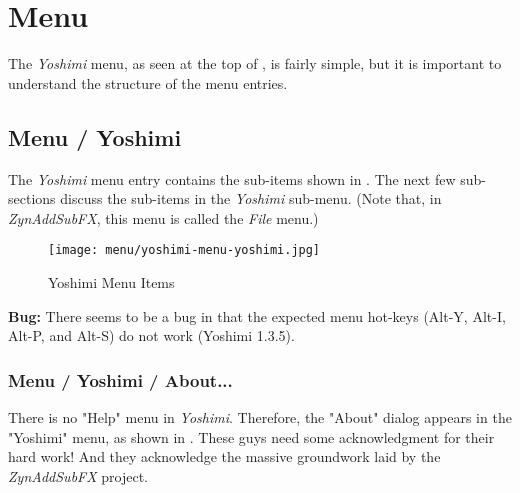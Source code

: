 %
%
%

\section{Menu}
\label{sec:menu}

   The \textsl{Yoshimi} menu, as seen at the top of
   ,
   is fairly simple, but it is important to understand the
   structure of the menu entries.

\subsection{Menu / Yoshimi}
\label{subsec:menu_yoshimi}

   The \textsl{Yoshimi}
   menu entry contains the sub-items shown in
   .
   The next few sub-sections discuss the sub-items in the 
   \textsl{Yoshimi} sub-menu.
   (Note that, in \textsl{ZynAddSubFX}, this menu is called the
   \textsl{File} menu.)

\begin{figure}[H]
   \centering 
   \texttt{[image: menu/yoshimi-menu-yoshimi.jpg]}
   \caption{Yoshimi Menu Items}
   \label{fig:yoshimi_menu_items}
\end{figure}

   \textbf{Bug:}
   There seems to be a bug in that the expected menu hot-keys
   (Alt-Y, Alt-I, Alt-P, and Alt-S) do not work (Yoshimi 1.3.5).

\subsubsection{Menu / Yoshimi / About...}
\label{subsubsec:menu_yoshimi_about}

   There is no "Help" menu in \textsl{Yoshimi}.
   Therefore, the "About" dialog appears in the "Yoshimi" menu, as shown in
   .
   These guys need some acknowledgment for their hard work!
   And they acknowledge the massive groundwork laid by the
   \textsl{ZynAddSubFX} project.

